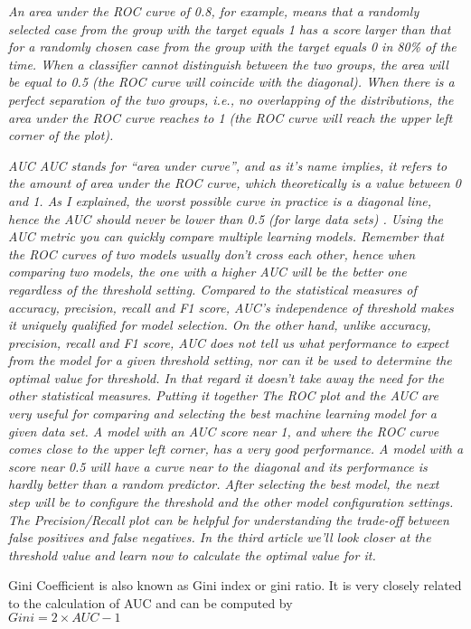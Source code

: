 \textit{An area under the ROC curve of 0.8, for example, means that a randomly selected case from the group with the target equals 1 has a score larger than that for a randomly chosen case from the group with the target equals 0 in 80\% of the time. When a classifier cannot distinguish between the two groups, the area will be equal to 0.5 (the ROC curve will coincide with the diagonal). When there is a perfect separation of the two groups, i.e., no overlapping of the distributions, the area under the ROC curve reaches to 1 (the ROC curve will reach the upper left corner of the plot).}

\textit{AUC
AUC stands for “area under curve”, and as it's name implies, it refers to the amount of area under the ROC curve, which theoretically is a value between 0 and 1. As I explained, the worst possible curve in practice is a diagonal line, hence the AUC should never be lower than 0.5 (for large data sets) .
Using the AUC metric you can quickly compare multiple learning models. Remember that the ROC curves of two models usually don’t cross each other, hence when comparing two models, the one with a higher AUC will be the better one regardless of the threshold setting. Compared to the statistical measures of accuracy, precision, recall and F1 score, AUC’s independence of threshold makes it uniquely qualified for model selection.
On the other hand, unlike accuracy, precision, recall and F1 score, AUC does not tell us what performance to expect from the model for a given threshold setting, nor can it be used to determine the optimal value for threshold. In that regard it doesn't take away the need for the other statistical measures.
Putting it together
The ROC plot and the AUC are very useful for comparing and selecting the best machine learning model for a given data set. A model with an AUC score near 1, and where the ROC curve comes close to the upper left corner, has a very good performance. A model with a score near 0.5 will have a curve near to the diagonal and its performance is hardly better than a random predictor.
After selecting the best model, the next step will be to configure the threshold and the other model configuration settings. The Precision/Recall plot can be helpful for understanding the trade-off between false positives and false negatives. In the third article we’ll look closer at the threshold value and learn now to calculate the optimal value for it.
}

Gini Coefficient is also known as Gini index or gini ratio. It is very closely related to the calculation of AUC and can be computed by\\
$Gini = 2 \times AUC - 1$


